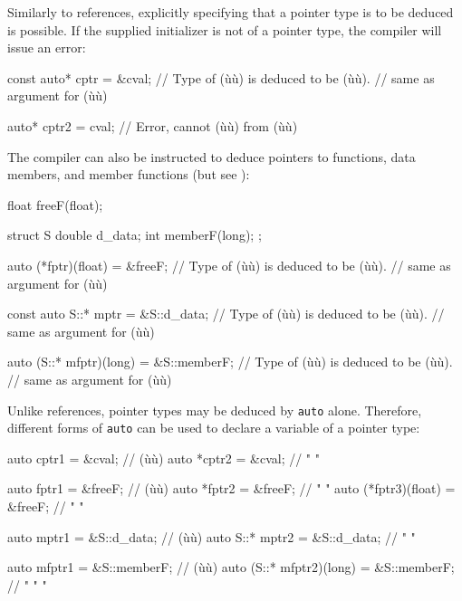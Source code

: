 \noindent Similarly to references, explicitly specifying that a
pointer type is to be deduced is possible. If the supplied initializer is not of a
pointer type, the compiler will issue an error:

\begin{emcppslisting}[language=C++]
const auto* cptr = &cval;
    // Type of (ù{}ù) is deduced to be (ù{}ù).
    // same as argument for (ù{}ù)

auto* cptr2 = cval;  // Error, cannot (ù{}ù) from (ù{}ù)
\end{emcppslisting}
    
\noindent The compiler can also be instructed to deduce pointers to functions,
data members, and member functions (but see ):

\begin{emcppslisting}[language=C++]
float freeF(float);

struct S
{
    double d_data;
    int memberF(long);
};

auto (*fptr)(float) = &freeF;
  // Type of (ù{}ù) is deduced to be (ù{}ù).
  // same as argument for (ù{}ù)

const auto S::* mptr = &S::d_data;
  // Type of (ù{}ù) is deduced to be (ù{}ù).
  // same as argument for (ù{}ù)

auto (S::* mfptr)(long) = &S::memberF;
  // Type of (ù{}ù) is deduced to be (ù{}ù).
  // same as argument for (ù{}ù)
\end{emcppslisting}
    
\noindent Unlike references, pointer types may be deduced by \lstinline!auto! alone.
Therefore, different forms of \lstinline!auto! can be used to declare a
variable of a pointer type:

\begin{emcppslisting}[language=C++]
auto  cptr1 = &cval;  // (ù{}ù)
auto *cptr2 = &cval;  //   "     "

auto   fptr1         = &freeF;  // (ù{}ù)
auto  *fptr2         = &freeF;  //    "         "
auto (*fptr3)(float) = &freeF;  //    "         "

auto      mptr1 = &S::d_data;  // (ù{}ù)
auto S::* mptr2 = &S::d_data;  //    "     "

auto       mfptr1        = &S::memberF;  // (ù{}ù)
auto (S::* mfptr2)(long) = &S::memberF;  //   "    "     "
\end{emcppslisting}
    
